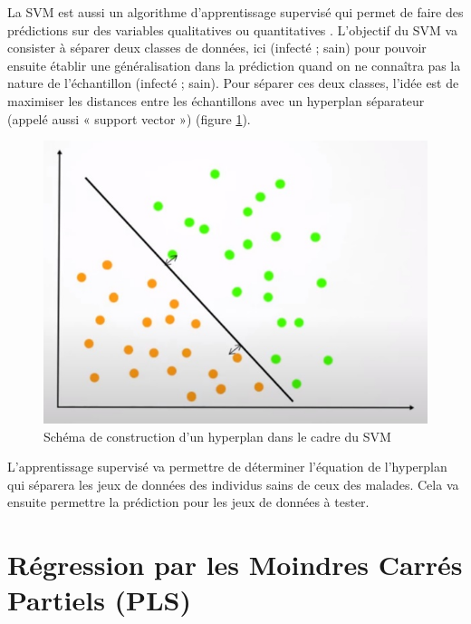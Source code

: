 \documentclass[
  11pt,
  french,
  a4paper,
  extrafontsizes,onecolumn,openright
  ]{memoir}
\begin{document}
La SVM est aussi un algorithme d'apprentissage supervisé qui permet de faire des prédictions sur des variables qualitatives ou quantitatives \autocite{e1071}. L'objectif du SVM va consister à séparer deux classes de données, ici (infecté ; sain) pour pouvoir ensuite établir une généralisation dans la prédiction quand on ne connaîtra pas la nature de l'échantillon (infecté ; sain). Pour séparer ces deux classes, l'idée est de maximiser les distances entre les échantillons avec un hyperplan séparateur (appelé aussi « support vector ») (figure \ref{fig:14}\autocite{cortes_support-vector_1995}).

\scriptsize

\begin{figure}

{\centering \includegraphics[width=0.8\linewidth]{Images/Figure14} 

}

\caption{Schéma de construction d’un hyperplan dans le cadre du SVM}\label{fig:14}
\end{figure}

\normalsize

L'apprentissage supervisé va permettre de déterminer l'équation de l'hyperplan qui séparera les jeux de données des individus sains de ceux des malades. Cela va ensuite permettre la prédiction pour les jeux de données à tester.

\vfill
\newpage

\hypertarget{ruxe9gression-par-les-moindres-carruxe9s-partiels-pls}{%
\section{Régression par les Moindres Carrés Partiels (PLS)}\label{ruxe9gression-par-les-moindres-carruxe9s-partiels-pls}}
\end{document}
